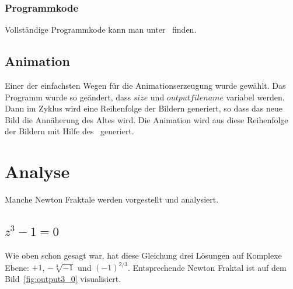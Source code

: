 \documentclass[a4paper,12pt]{llncs}
\numberwithin{equation}{section}
\begin{document}
\subsubsection{Programmkode}
Vollständige Programmkode kann man unter~\cite{source} finden.

\subsection{Animation}\label{subs:vis:anime}
Einer der einfachsten Wegen für die Animationserzeugung wurde gewählt. 
Das Programm wurde so geändert, dass $size$ und $outputfilename$ variabel werden. 
Dann im Zyklus wird eine Reihenfolge der Bildern generiert, so dass das neue Bild die Annäherung des Altes wird.
Die Animation wird aus diese Reihenfolge der Bildern mit Hilfe des~\cite{animegen} generiert.

\section{Analyse}\label{sec:analy}
Manche Newton Fraktale werden vorgestellt und analysiert.

\subsection{$z^3 - 1 = 0$}
Wie oben schon gesagt war, hat diese Gleichung drei Lösungen auf Komplexe Ebene: $+1$, $-\sqrt[3]{-1}$ und $(-1)^{2/3}$. Entsprechende Newton Fraktal ist auf dem Bild~\ref{fig:output3_0} visualisiert. 
\end{document}
